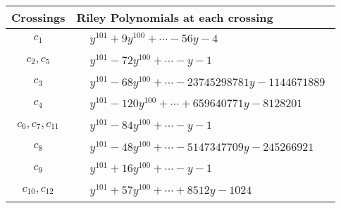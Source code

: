 \documentclass[1p]{elsarticle_modified}
\theoremstyle{definition}
\begin{document}
\begin{tabular}{m{50pt}|m{274pt}}
Crossings & \hspace{64pt}Riley Polynomials at each crossing \\
\hline $$\begin{aligned}c_{1}\end{aligned}$$&$\begin{aligned}
&y^{101}+9 y^{100}+\cdots-56 y-4
\end{aligned}$\\
\hline $$\begin{aligned}c_{2},c_{5}\end{aligned}$$&$\begin{aligned}
&y^{101}-72 y^{100}+\cdots- y-1
\end{aligned}$\\
\hline $$\begin{aligned}c_{3}\end{aligned}$$&$\begin{aligned}
&y^{101}-68 y^{100}+\cdots-23745298781 y-1144671889
\end{aligned}$\\
\hline $$\begin{aligned}c_{4}\end{aligned}$$&$\begin{aligned}
&y^{101}-120 y^{100}+\cdots+659640771 y-8128201
\end{aligned}$\\
\hline $$\begin{aligned}c_{6},c_{7},c_{11}\end{aligned}$$&$\begin{aligned}
&y^{101}-84 y^{100}+\cdots- y-1
\end{aligned}$\\
\hline $$\begin{aligned}c_{8}\end{aligned}$$&$\begin{aligned}
&y^{101}-48 y^{100}+\cdots-5147347709 y-245266921
\end{aligned}$\\
\hline $$\begin{aligned}c_{9}\end{aligned}$$&$\begin{aligned}
&y^{101}+16 y^{100}+\cdots- y-1
\end{aligned}$\\
\hline $$\begin{aligned}c_{10},c_{12}\end{aligned}$$&$\begin{aligned}
&y^{101}+57 y^{100}+\cdots+8512 y-1024
\end{aligned}$\\
\hline
\end{tabular}\\~\\
\end{document}
